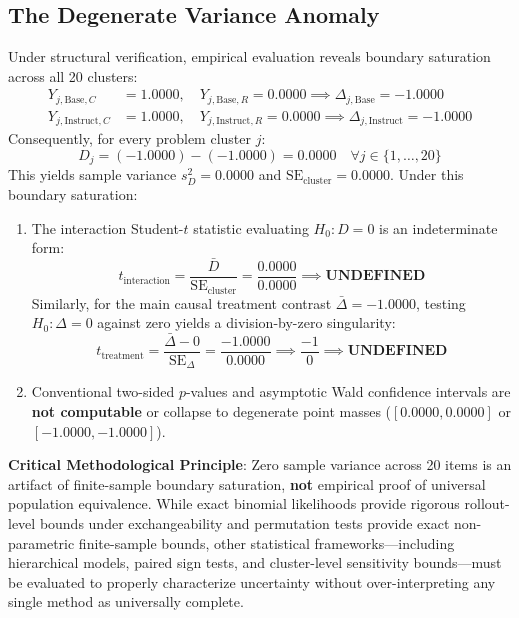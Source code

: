 \documentclass[11pt,letterpaper]{article}
\begin{document}
\subsection{The Degenerate Variance Anomaly}
Under structural verification, empirical evaluation reveals boundary saturation across all 20 clusters:
\begin{align}
Y_{j, \text{Base}, C} &= 1.0000, \quad Y_{j, \text{Base}, R} = 0.0000 \implies \Delta_{j, \text{Base}} = -1.0000 \\
Y_{j, \text{Instruct}, C} &= 1.0000, \quad Y_{j, \text{Instruct}, R} = 0.0000 \implies \Delta_{j, \text{Instruct}} = -1.0000
\end{align}
Consequently, for every problem cluster $j$:
\begin{equation}
D_j = (-1.0000) - (-1.0000) = 0.0000 \quad \forall j \in \{1, \dots, 20\}
\end{equation}
This yields sample variance $s_D^2 = 0.0000$ and $\mathrm{SE}_{\text{cluster}} = 0.0000$. Under this boundary saturation:
\begin{enumerate}
    \item The interaction Student-$t$ statistic evaluating $H_0: D = 0$ is an indeterminate form:
    \begin{equation}
    t_{\text{interaction}} = \frac{\bar{D}}{\mathrm{SE}_{\text{cluster}}} = \frac{0.0000}{0.0000} \implies \textbf{UNDEFINED}
    \end{equation}
    Similarly, for the main causal treatment contrast $\bar{\Delta} = -1.0000$, testing $H_0: \Delta = 0$ against zero yields a division-by-zero singularity:
    \begin{equation}
    t_{\text{treatment}} = \frac{\bar{\Delta} - 0}{\mathrm{SE}_{\Delta}} = \frac{-1.0000}{0.0000} \implies \frac{-1}{0} \implies \textbf{UNDEFINED}
    \end{equation}
    \item Conventional two-sided $p$-values and asymptotic Wald confidence intervals are \textbf{not computable} or collapse to degenerate point masses ($[0.0000, 0.0000]$ or $[-1.0000, -1.0000]$).
\end{enumerate}
\textbf{Critical Methodological Principle}: Zero sample variance across 20 items is an artifact of finite-sample boundary saturation, \textbf{not} empirical proof of universal population equivalence. While exact binomial likelihoods provide rigorous rollout-level bounds under exchangeability and permutation tests provide exact non-parametric finite-sample bounds, other statistical frameworks---including hierarchical models, paired sign tests, and cluster-level sensitivity bounds---must be evaluated to properly characterize uncertainty without over-interpreting any single method as universally complete.
\end{document}
